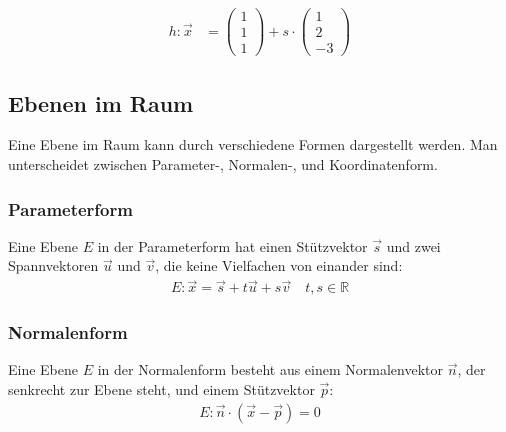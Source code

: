 \begin{flushleft}
\begin{align}
    h\colon\vec{x}&=\begin{pmatrix} 1 \\ 1 \\ 1 \end{pmatrix}+s\cdot\begin{pmatrix} 1 \\ 2 \\ -3 \end{pmatrix}
\end{align}
\end{flushleft}

\subsection{Ebenen im Raum}
\begin{flushleft}
Eine Ebene im Raum kann durch verschiedene Formen dargestellt werden.
Man unterscheidet zwischen Parameter-, Normalen-, und Koordinatenform.
\end{flushleft}

\subsubsection{Parameterform}
\begin{flushleft}
Eine Ebene $E$ in der Parameterform hat einen Stützvektor $\vec{s}$ und zwei Spannvektoren $\vec{u}$ und $\vec{v}$, die keine Vielfachen von einander sind:
\begin{align}
    E\colon\vec{x}=\vec{s}+t\vec{u}+s\vec{v} \quad t,s\in\mathbb{R}
\end{align}
\end{flushleft}


\subsubsection{Normalenform}
\begin{flushleft}
Eine Ebene $E$ in der Normalenform besteht aus einem Normalenvektor $\vec{n}$, der senkrecht zur Ebene steht, und einem Stützvektor $\vec{p}$:
\begin{align}
    E\colon\vec{n}\cdot\left(\vec{x}-\vec{p}\right)=0
\end{align}
\end{flushleft}


